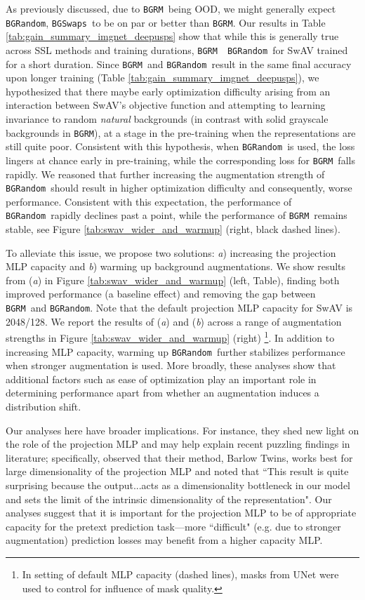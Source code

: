 \documentclass[twoside,11pt]{article}
\newcommand{\bgrm}{\texttt{BG\textunderscore RM}}
\newcommand{\bgswaps}{\texttt{BG\textunderscore Swaps}}
\newcommand{\bgrand}{\texttt{BG\textunderscore Random}}
\begin{document}
As previously discussed, due to \bgrm~being OOD, we might generally expect \bgrand, \bgswaps~to be on par or better than \bgrm. Our results in Table \ref{tab:gain_summary_imgnet_deepusps} show that while this is generally true across SSL methods and training durations, \bgrm~~\bgrand~for SwAV trained for a short duration. Since  \bgrm~and \bgrand~result in the same final accuracy upon longer training (Table \ref{tab:gain_summary_imgnet_deepusps}), we hypothesized that there maybe early optimization difficulty arising from an interaction between SwAV's objective function and attempting to learning invariance to random \textit{natural} backgrounds (in contrast with solid grayscale backgrounds in \bgrm), at a stage in the pre-training when the representations are still quite poor. Consistent with this hypothesis, when \bgrand~is used, the loss lingers at chance early in pre-training, while the corresponding loss for \bgrm~falls rapidly. We reasoned that further increasing the augmentation strength of \bgrand~should result in higher optimization difficulty and consequently, worse performance. Consistent with this expectation, the performance of \bgrand~rapidly declines past a point, while the performance of \bgrm~remains stable, see Figure \ref{tab:swav_wider_and_warmup} (right, black dashed lines). 


To alleviate this issue, we propose two solutions: \textit{a}) increasing the projection MLP capacity and \textit{b}) warming up background augmentations. We show results from (\textit{a}) in Figure \ref{tab:swav_wider_and_warmup} (left, Table), finding both improved performance (a baseline effect) and removing the gap between \bgrm~and \bgrand. Note that the default projection MLP capacity for SwAV is 2048/128. We report the results of (\textit{a}) and (\textit{b}) across a range of augmentation strengths in Figure \ref{tab:swav_wider_and_warmup} (right) \footnote{In setting of default MLP capacity (dashed lines), masks from UNet were used to control for influence of mask quality.}. In addition to increasing MLP capacity, warming up \bgrand~further stabilizes performance when stronger augmentation is used. More broadly, these analyses show that additional factors such as ease of optimization play an important role in determining performance apart from whether an augmentation induces a distribution shift. 

Our analyses here have broader implications. For instance, they shed new light on the role of the projection MLP and may help explain recent puzzling findings in literature; specifically, \citet{zbontar_barlow_2021} observed that their method, Barlow Twins, works best for large dimensionality of the projection MLP and noted that ``This result is quite surprising because the output...acts as a dimensionality bottleneck in our model and sets the limit of the intrinsic dimensionality of the representation". Our analyses suggest that it is important for the projection MLP to be of appropriate capacity for the pretext prediction task---more ``difficult" (e.g. due to stronger augmentation) prediction losses may benefit from a higher capacity MLP.
\end{document}

